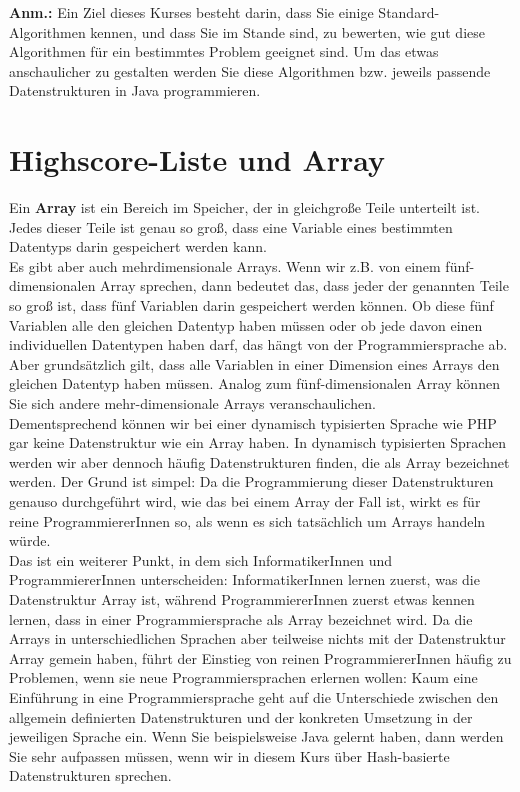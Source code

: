 \textbf{Anm.:} Ein Ziel dieses Kurses besteht darin, dass Sie einige Standard-\\Algorithmen kennen, und dass Sie im Stande sind, zu bewerten, wie gut diese Algorithmen für ein bestimmtes Problem geeignet sind. Um das etwas anschaulicher zu gestalten werden Sie diese Algorithmen bzw. jeweils passende Datenstrukturen in Java programmieren.

\section{Highscore-Liste und Array}

Ein \textbf{Array} ist ein Bereich im Speicher, der in gleichgroße Teile unterteilt ist. Jedes dieser Teile ist genau so groß, dass eine Variable eines bestimmten Datentyps darin gespeichert werden kann.\\

Es gibt aber auch mehrdimensionale Arrays. Wenn wir z.B. von einem fünf-dimensionalen Array sprechen, dann bedeutet das, dass jeder der genannten Teile so groß ist, dass fünf Variablen darin gespeichert werden können. Ob diese fünf Variablen alle den gleichen Datentyp haben müssen oder ob jede davon einen individuellen Datentypen haben darf, das hängt von der Programmiersprache ab. Aber grundsätzlich gilt, dass alle Variablen in einer Dimension eines Arrays den gleichen Datentyp haben müssen. Analog zum fünf-dimensionalen Array können Sie sich andere mehr-dimensionale Arrays veranschaulichen.\\

Dementsprechend können wir bei einer dynamisch typisierten Sprache wie PHP gar keine Datenstruktur wie ein Array haben. In dynamisch typisierten Sprachen werden wir aber dennoch häufig Datenstrukturen finden, die als Array bezeichnet werden. Der Grund ist simpel: Da die Programmierung dieser Datenstrukturen genauso durchgeführt wird, wie das bei einem Array der Fall ist, wirkt es für reine ProgrammiererInnen so, als wenn es sich tatsächlich um Arrays handeln würde.\\

Das ist ein weiterer Punkt, in dem sich InformatikerInnen und ProgrammiererInnen unterscheiden: InformatikerInnen lernen zuerst, was die Datenstruktur Array ist, während ProgrammiererInnen zuerst etwas kennen lernen, dass in einer Programmiersprache als Array bezeichnet wird. Da die \glqq{}Arrays\grqq{} in unterschiedlichen Sprachen aber teilweise nichts mit der Datenstruktur Array gemein haben, führt der Einstieg von reinen ProgrammiererInnen häufig zu Problemen, wenn sie neue Programmiersprachen erlernen wollen: Kaum eine Einführung in eine Programmiersprache geht auf die Unterschiede zwischen den allgemein definierten Datenstrukturen und der konkreten Umsetzung in der jeweiligen Sprache ein. Wenn Sie beispielsweise Java gelernt haben, dann werden Sie sehr aufpassen müssen, wenn wir in diesem Kurs über Hash-basierte Datenstrukturen sprechen.\\

